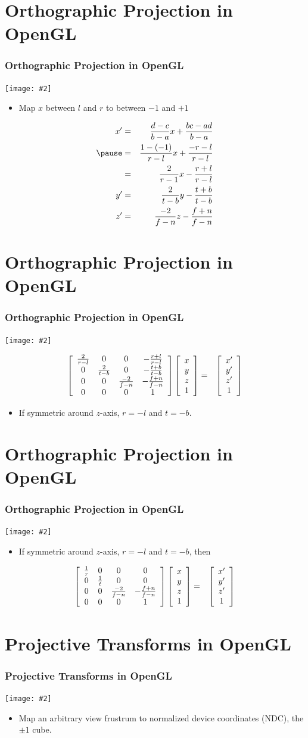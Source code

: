 \documentclass[slidestop,xcolor=pst]{beamer}
\newcommand{\graphc}[2]{\centerline{\texttt{[image: \#2]}}}
\newcommand{\sect}[1]{
\section{#1}
\begin{frame}[fragile]\frametitle{#1}
}
\begin{document}
\sect{Orthographic Projection in OpenGL}
\graphc{1}{onedlinear.png}
\begin{itemize}
\item Map $x$ between $l$ and $r$ to between $-1$ and $+1$
\end{itemize}
\begin{eqnarray*}
x' &=& \frac{d-c}{b-a}x + \frac{bc - ad}{b-a} \\\pause
   &=& \frac{1-(-1)}{r-l}x + \frac{-r-l}{r-l}\\
    &=& \frac{2}{r-1}x - \frac{r+l}{r-l}\\
y' &=& \frac{2}{t-b}y - \frac{t+b}{t-b}\\
z' &=& \frac{-2}{f-n}z - \frac{f+n}{f-n}
\end{eqnarray*}
\end{frame}

\sect{Orthographic Projection in OpenGL}
\graphc{.9}{gl_projectionmatrix02.png}
\begin{eqnarray*}
\left[\begin{array}{cccc} \frac{2}{r-l} & 0 & 0 & -\frac{r+l}{r-l} \\ 0 & \frac{2}{t-b} & 0 & -\frac{t+b}{t-b} \\ 0 & 0 & \frac{-2}{f-n} & -\frac{f+n}{f-n} \\0&0&0&1\end{array}\right]
\left[\begin{array}{c} x\\y\\z \\ 1\end{array}\right] 
&=&
\left[\begin{array}{c} x'\\y'\\z' \\ 1\end{array}\right]
\end{eqnarray*}
\begin{itemize}
\item If symmetric around $z$-axis, $r=-l$ and $t=-b$.
\end{itemize}
\end{frame}

\sect{Orthographic Projection in OpenGL}
\graphc{.9}{gl_projectionmatrix02.png}
\begin{itemize}
\item If symmetric around $z$-axis, $r=-l$ and $t=-b$, then
\end{itemize}
\begin{eqnarray*}
\left[\begin{array}{cccc} \frac{1}{r} & 0 & 0 & 0 \\ 0 & \frac{1}{t} & 0 & 0 \\ 0 & 0 & \frac{-2}{f-n} & -\frac{f+n}{f-n} \\0&0&0&1\end{array}\right]
\left[\begin{array}{c} x\\y\\z \\ 1\end{array}\right] 
&=&
\left[\begin{array}{c} x'\\y'\\z' \\ 1\end{array}\right]
\end{eqnarray*}
\end{frame}


\sect{Projective Transforms in OpenGL}
\graphc{1}{gl_projectionmatrix01.png}
\begin{itemize}
\item Map an arbitrary view frustrum to
  normalized device coordinates (NDC), the $\pm 1$ cube.
\end{itemize}
\end{frame}
\end{document}
